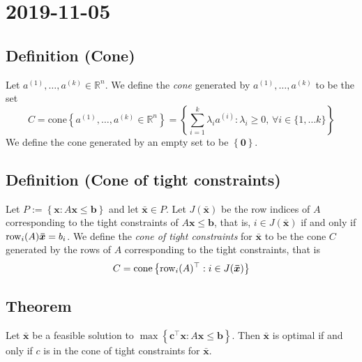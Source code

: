 \section{2019-11-05}
\begin{defbox}
    \subsection{Definition (Cone)}
    Let $ a^{(1)},\ldots ,a^{(k)} \in \mathbb{R}^n $.
    We define the \emph{cone} generated by $ a^{(1)},\ldots ,a^{(k)} $ to
    be the set
    \[ C=\text{cone}
    \left\{ a^{(1)},\ldots ,a^{(k)}\in\mathbb{R}^n \right\}=\left\{ \sum\limits_{i=1}^{k} \lambda_i a^{(i)}:\lambda_i\ge 0,\,
    \forall i\in\{1,\ldots k\}\right\} \]
    We define the cone generated by an empty set to be $ \left\{\bm{0}\right\} $.
\end{defbox}

\begin{defbox}
    \subsection{Definition (Cone of tight constraints)}
    Let $ P:=\left\{ \bm{x}:A \bm{x}\le \bm{b}\right\} $ and let
    $ \bm{\bar{x}}\in P $. Let $ J(\bm{\bar{x}}) $ be the row
    indices of $ A $ corresponding to the tight constraints
    of $ A \bm{x}\le \bm{b} $, that is, $ i\in J(\bm{\bar{x}}) $
    if and only if $ \operatorname{row}_i(A)\bm{\bar{x}}=b_i $.
    We define the \emph{cone of tight constraints} for $ \bm{\bar{x}} $ to
    be the cone $ C $ generated by the rows of $ A $ corresponding to
    the tight constraints, that is
    \[ C=\operatorname{cone}\left\{ \operatorname{row}_i(A)^\top:i\in J(\bm{\bar{x}})\right\} \]
\end{defbox}

\begin{thmbox}
    \subsection{Theorem}
    Let $ \bm{\bar{x}} $ be a feasible solution to $ \max \left\{ \bm{c}^\top
    \bm{x}:A \bm{x}\le \bm{b}\right\} $. Then $ \bm{\bar{x}} $ is
    optimal if and only if $ c $ is in the cone of tight constraints
    for $ \bm{\bar{x}} $.
\end{thmbox}